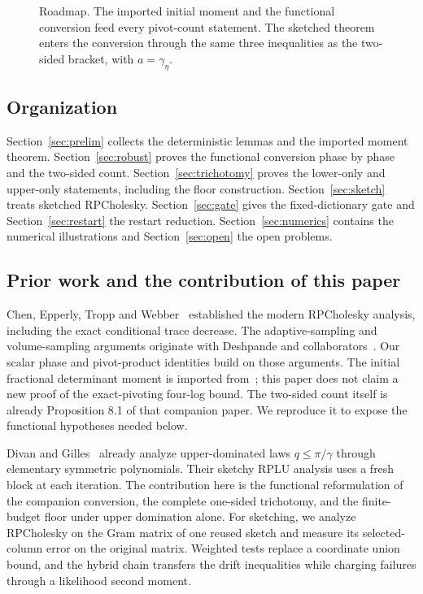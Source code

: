 \documentclass[11pt]{article}
\theoremstyle{definition}\newtheorem{definition}[theorem]{Definition}
\theoremstyle{remark}\newtheorem{remark}[theorem]{Remark}
\newcommand{\1}{\mathbf 1}
\begin{document}
\begin{figure}[t]
\caption{Roadmap. The imported initial moment and the functional
conversion feed every pivot-count statement. The sketched theorem enters
the conversion through the same three inequalities as the two-sided
bracket, with $a=\gamma_\eta$.}
\label{fig:roadmap}
\end{figure}

\subsection{Organization}
Section~\ref{sec:prelim} collects the deterministic lemmas and the
imported moment theorem. Section~\ref{sec:robust} proves the functional
conversion phase by phase and the two-sided count.
Section~\ref{sec:trichotomy} proves the lower-only and upper-only
statements, including the floor construction. Section~\ref{sec:sketch}
treats sketched RPCholesky. Section~\ref{sec:gate} gives the
fixed-dictionary gate and Section~\ref{sec:restart} the restart
reduction. Section~\ref{sec:numerics} contains the numerical
illustrations and Section~\ref{sec:open} the open problems.

\subsection{Prior work and the contribution of this paper}
Chen, Epperly, Tropp and Webber~\cite{CETW} established the modern
RPCholesky analysis, including the exact conditional trace decrease.
The adaptive-sampling and volume-sampling arguments originate with
Deshpande and collaborators~\cite{DRVW,DV}. Our scalar phase and
pivot-product identities build on those arguments. The initial
fractional determinant moment is imported from~\cite{RA01}; this paper
does not claim a new proof of the exact-pivoting four-log bound.
The two-sided count itself is already Proposition 8.1 of that companion
paper. We reproduce it to expose the functional hypotheses needed below.

Divan and Gilles~\cite[Theorem 3.1]{DG} already analyze upper-dominated
laws $q\le\pi/\gamma$ through elementary symmetric polynomials. Their
sketchy RPLU analysis uses a fresh block at each iteration. The
contribution here is the functional reformulation of the companion
conversion, the complete one-sided trichotomy, and the finite-budget
floor under upper domination alone. For sketching,
we analyze RPCholesky on the Gram matrix of one reused sketch and measure
its selected-column error on the original matrix. Weighted tests replace
a coordinate union bound, and the hybrid chain transfers the drift
inequalities while charging failures through a likelihood second moment.
\end{document}

